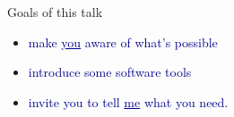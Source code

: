 \documentclass{beamer}
\begin{document}
\begin{frame}{}


\end{frame}

\begin{frame}{Goals of this talk}
\Large
\begin{itemize}\setlength{\itemsep}{0.5 cm}
\item \textcolor{darkblue}{make \underline{you} aware of what's possible}
\item \textcolor{darkblue}{introduce some software tools}
\item \textcolor{darkblue}{invite you to tell \underline{me} what you need.}
\end{itemize}
\end{frame}
\end{document}
